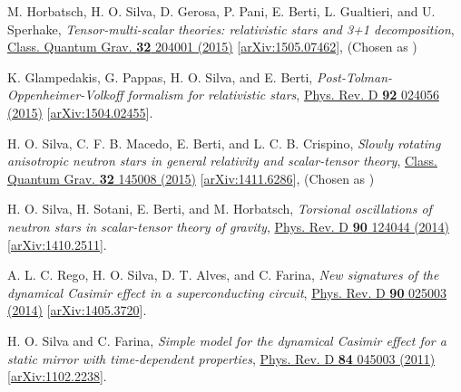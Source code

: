\documentclass[11pt]{article}
\newcommand{\MYhref}[3][blue]{\href{#2}{\color{#1}{#3}}}
\begin{document}
\begin{etaremune}[
        start=\value{pubCounter},
        topsep=0pt,
        partopsep=0pt]
    \item \label{itm:multiscalar}
    M. Horbatsch, H. O. Silva, D. Gerosa, P. Pani, E. Berti, L. Gualtieri, and U. Sperhake,
    \emph{Tensor-multi-scalar theories: relativistic stars and 3+1 decomposition},
    \href{http://iopscience.iop.org/article/10.1088/0264-9381/32/20/204001/meta;jsessionid=575DFA8E53663683D64E28DF82CE0294.c1}{Class. Quantum Grav.
    {\bf32} 204001 (2015)}
    [\href{http://arxiv.org/abs/1505.07462}{arXiv:1505.07462}],
    (Chosen as
    \MYhref[venetianred]{http://iopscience.iop.org/collections}{\sc IOPSelect})

    \item K. Glampedakis, G. Pappas, H. O. Silva, and E. Berti,
    \emph{Post-Tolman-Oppenheimer-Volkoff formalism for relativistic stars},
    \href{http://journals.aps.org/prd/abstract/10.1103/PhysRevD.92.024056}{Phys. Rev. D {\bf92} 024056 (2015)}
    [\href{http://arxiv.org/abs/1504.02455}{arXiv:1504.02455}].

    \item \label{itm:anisostar}
    H. O. Silva, C. F. B. Macedo, E. Berti, and L. C. B. Crispino,
    \emph{Slowly rotating anisotropic neutron stars in general relativity and scalar-tensor theory},
    \href{http://iopscience.iop.org/article/10.1088/0264-9381/32/14/145008/meta}{Class. Quantum Grav. {\bf32} 145008 (2015)}
    [\href{http://arxiv.org/abs/1411.6286}{arXiv:1411.6286}],
    (Chosen as
    \MYhref[venetianred]{http://iopscience.iop.org/collections}{\sc IOPSelect})

    \item H. O. Silva, H. Sotani, E. Berti, and M. Horbatsch,
    \emph{Torsional oscillations of neutron stars in scalar-tensor theory of gravity},
    \href{http://journals.aps.org/prd/abstract/10.1103/PhysRevD.90.124044}{Phys. Rev. D {\bf90} 124044 (2014)}
    [\href{http://arxiv.org/abs/1410.2511}{arXiv:1410.2511}].

    \item A. L. C. Rego, H. O. Silva, D. T. Alves, and C. Farina,
    \emph{New signatures of the dynamical Casimir effect in a superconducting circuit},
    \href{http://journals.aps.org/prd/abstract/10.1103/PhysRevD.90.025003}{Phys. Rev. D {\bf90} 025003 (2014)}
    [\href{http://arxiv.org/abs/1410.2511}{arXiv:1405.3720}].

    \item \label{itm:robintd}
    H. O. Silva and C. Farina,
    \emph{Simple model for the dynamical Casimir effect for a static mirror with time-dependent properties},
    \href{http://journals.aps.org/prd/abstract/10.1103/PhysRevD.84.045003}{Phys. Rev. D {\bf84} 045003 (2011)}
    [\href{http://arxiv.org/abs/1102.2238}{arXiv:1102.2238}].


\end{etaremune}
\end{document}
